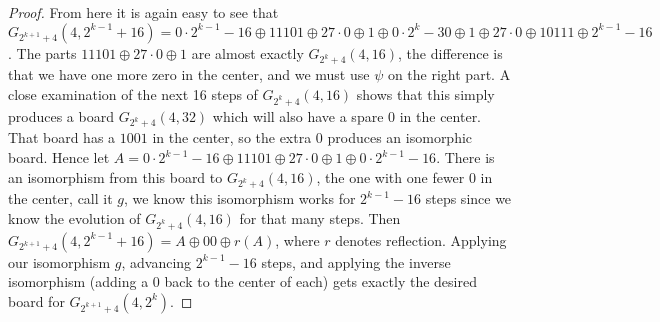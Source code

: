 \documentclass[12pt,letterpaper]{article}
\begin{document}
\begin{proof}
  From here it is again easy to see that $G_{2^{k+1}+4}(4,2^{k-1}+16)=0\cdot 2^{k-1}-16\oplus 11101\oplus 27\cdot 0\oplus 1\oplus 0\cdot 2^k-30\oplus 1\oplus 27\cdot 0\oplus 10111\oplus 2^{k-1}-16$. The parts $11101\oplus 27\cdot 0\oplus 1$ are almost exactly $G_{2^k+4}(4,16)$, the difference is that we have one more zero in the center, and we must use $\psi$ on the right part. A close examination of the next 16 steps of $G_{2^k+4}(4,16)$ shows that this simply produces a board $G_{2^k+4}(4,32)$ which will also have a spare 0 in the center. That board has a $1001$ in the center, so the extra 0 produces an isomorphic board. Hence let $A=0\cdot 2^{k-1}-16\oplus 11101\oplus 27\cdot 0\oplus 1\oplus 0\cdot 2^{k-1}-16$. There is an isomorphism from this board to $G_{2^k+4}(4,16)$, the one with one fewer 0 in the center, call it $g$, we know this isomorphism works for $2^{k-1}-16$ steps since we know the evolution of $G_{2^k+4}(4,16)$ for that many steps. Then $G_{2^{k+1}+4}(4,2^{k-1}+16)=A\oplus 00\oplus r(A)$, where $r$ denotes reflection. Applying our isomorphism $g$, advancing $2^{k-1}-16$ steps, and applying the inverse isomorphism (adding a 0 back to the center of each) gets exactly the desired board for $G_{2^{k+1}+4}(4,2^k)$. 
\end{proof}
\end{document}
